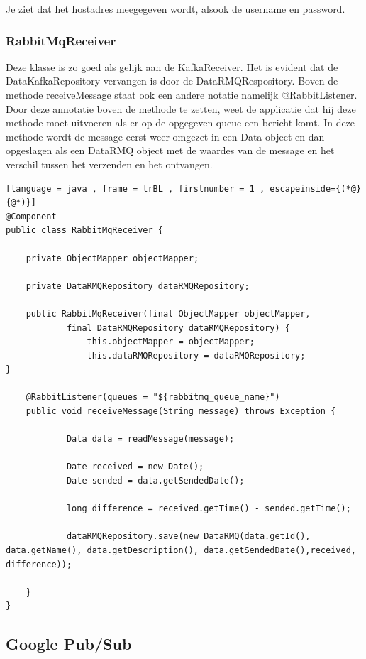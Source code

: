 Je ziet dat het hostadres meegegeven wordt, alsook de username en password.
\subsubsection{RabbitMqReceiver}
Deze klasse is zo goed als gelijk aan de KafkaReceiver. Het is evident dat de DataKafkaRepository vervangen is door de DataRMQRespository. Boven de methode receiveMessage staat ook een andere notatie namelijk @RabbitListener. Door deze annotatie boven de methode te zetten, weet de applicatie dat hij deze methode moet uitvoeren als er op de opgegeven queue een bericht komt. In deze methode wordt de message eerst weer omgezet in een Data object en dan opgeslagen als een DataRMQ object met de waardes van de message en het verschil tussen het verzenden en het ontvangen.
\begin{lstlisting}[language = java , frame = trBL , firstnumber = 1 , escapeinside={(*@}{@*)}]
@Component
public class RabbitMqReceiver {

    private ObjectMapper objectMapper;

    private DataRMQRepository dataRMQRepository;

    public RabbitMqReceiver(final ObjectMapper objectMapper,
            final DataRMQRepository dataRMQRepository) {
                this.objectMapper = objectMapper;
                this.dataRMQRepository = dataRMQRepository;
}

    @RabbitListener(queues = "${rabbitmq_queue_name}")
    public void receiveMessage(String message) throws Exception {
      
            Data data = readMessage(message);

            Date received = new Date();
            Date sended = data.getSendedDate();

            long difference = received.getTime() - sended.getTime();

            dataRMQRepository.save(new DataRMQ(data.getId(), data.getName(), data.getDescription(), data.getSendedDate(),received, difference));

    }
}
\end{lstlisting}
\subsection{Google Pub/Sub}
